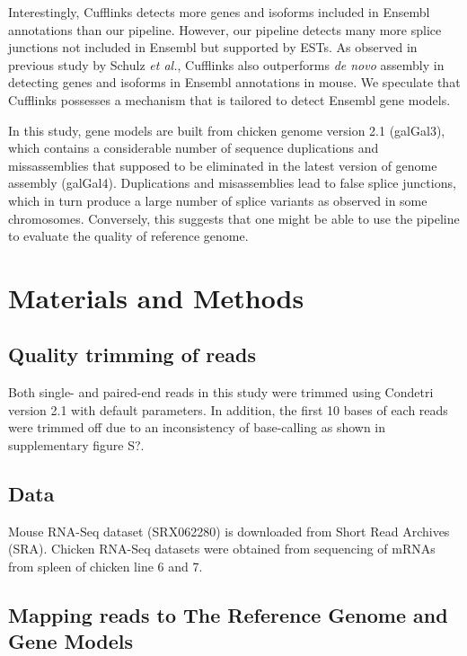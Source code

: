 \documentclass[10pt]{article}
\begin{document}
Interestingly, Cufflinks detects more genes and isoforms included in Ensembl annotations than our pipeline.
However, our pipeline detects many more splice junctions not included in Ensembl but supported by ESTs.
As observed in previous study by Schulz \emph{et al.}\cite{Schulz:2012je}, Cufflinks also outperforms \emph{de novo} assembly in
detecting genes and isoforms in Ensembl annotations in mouse.
We speculate that Cufflinks possesses a mechanism that is tailored to detect Ensembl gene models.

In this study, gene models are built from chicken genome version 2.1 (galGal3),
which contains a considerable number of sequence duplications and
missassemblies that supposed to be eliminated in the latest version of genome assembly (galGal4).
Duplications and misassemblies lead to false splice junctions, which in turn produce a large number of splice variants as
observed in some chromosomes.
Conversely, this suggests that one might be able to use the pipeline to evaluate the quality of reference genome.

\section*{Materials and Methods}

\subsection*{Quality trimming of reads}
Both single- and paired-end reads in this study were trimmed using Condetri version 2.1 with default parameters.
In addition, the first 10 bases of each reads were trimmed off due to an inconsistency of base-calling as shown in supplementary figure S?.

\subsection*{Data}
Mouse RNA-Seq dataset (SRX062280) is downloaded from Short Read Archives (SRA).
Chicken RNA-Seq datasets were obtained from sequencing of mRNAs from spleen of chicken line 6 and 7.

\subsection*{Mapping reads to The Reference Genome and Gene Models}
\end{document}

